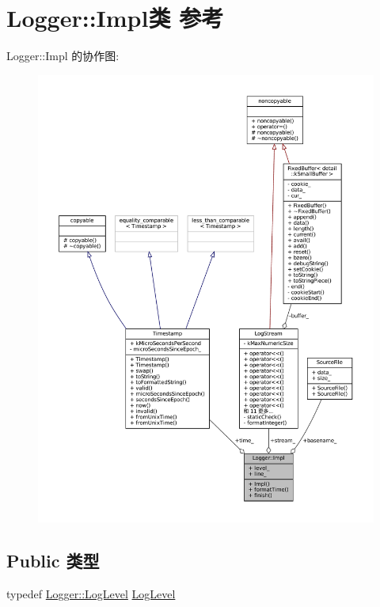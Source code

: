 \hypertarget{classmuduo_1_1Logger_1_1Impl}{}\section{Logger\+:\+:Impl类 参考}
\label{classmuduo_1_1Logger_1_1Impl}


Logger\+:\+:Impl 的协作图\+:
\nopagebreak
\begin{figure}[H]
\begin{center}
\leavevmode
\includegraphics[width=350pt]{classmuduo_1_1Logger_1_1Impl__coll__graph}
\end{center}
\end{figure}
\subsection*{Public 类型}
\begin{DoxyCompactItemize}
\item 
typedef \hyperlink{classmuduo_1_1Logger_aca1fd1d8935433e6ba2e3918214e07f9}{Logger\+::\+Log\+Level} \hyperlink{classmuduo_1_1Logger_1_1Impl_a562121cd8be97c8f9d8772d6b6a7c1cf}{Log\+Level}
\end{DoxyCompactItemize}
